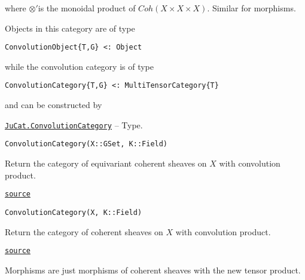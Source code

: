 \documentclass{memoir}
\begin{document}
where \(\otimes'\)is the monoidal product of \(Coh(X\times X\times X)\). Similar for morphisms.



Objects in this category are of type




\begin{lstlisting}
ConvolutionObject{T,G} <: Object
\end{lstlisting}



while the convolution category is of type




\begin{lstlisting}
ConvolutionCategory{T,G} <: MultiTensorCategory{T}
\end{lstlisting}



and can be constructed by


\hypertarget{6882204948059180058}{} 
\hyperlink{6882204948059180058}{\texttt{JuCat.ConvolutionCategory}}  -- {Type.}

\begin{adjustwidth}{2em}{0pt}


\begin{verbatim}
ConvolutionCategory(X::GSet, K::Field)
\end{verbatim}

Return the category of equivariant coherent sheaves on \(X\) with convolution product.



\href{https://github.com/FabianMaeurer/JuCat.jl/blob/367390e2d003deec2ababa73caeab405e934bb35/src/structures/ConvolutionCategory/ConvolutionCategory.jl#L23-L27}{\texttt{source}}



\begin{verbatim}
ConvolutionCategory(X, K::Field)
\end{verbatim}

Return the category of coherent sheaves on \(X\) with convolution product.



\href{https://github.com/FabianMaeurer/JuCat.jl/blob/367390e2d003deec2ababa73caeab405e934bb35/src/structures/ConvolutionCategory/ConvolutionCategory.jl#L45-L49}{\texttt{source}}


\end{adjustwidth}

Morphisms are just morphisms of coherent sheaves with the new tensor product.
\end{document}
